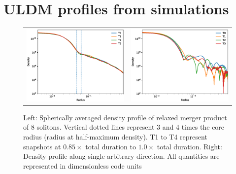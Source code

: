 \documentclass[a4paper,11pt]{article}
\begin{document}
\section{ULDM profiles from simulations}\label{sec:sim_comparison}


\begin{figure}
\begin{tabular}{cc}
{\includegraphics[scale = 0.55, trim={1.5cm 0 0 1cm}]{pics/combined3.eps}} &
{\includegraphics[scale = 0.55, trim={2cm 0 0 1cm}]{pics/singles.eps}}
\end{tabular}
\caption{Left: Spherically averaged density profile of relaxed merger product of 8 solitons. Vertical dotted lines represent 3 and 4 times the core radius (radius at half-maximum density). T1 to T4 represent snapshots at $0.85 \times$ total duration to $1.0 \times$ total duration. 
Right: Density profile along single arbitrary direction. All quantities are represented in dimensionless code units}\label{fig:pul}
\end{figure}
\end{document}
